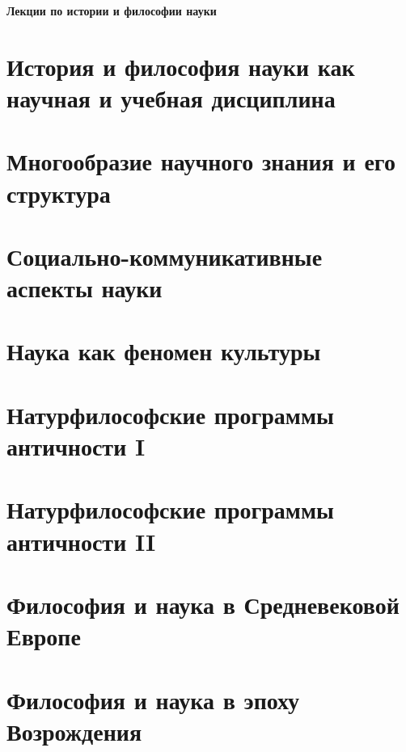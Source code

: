 \documentclass[a4paper, 12pt, notitlepage]{report}
\begin{document}
\begin{titlepage}
    \centering
    \vspace*{9cm}
    {\Huge \textbf{Лекции по истории и философии науки}}
    \vfill
\end{titlepage}

\tableofcontents

\chapter{История и философия науки как научная и учебная дисциплина}


\chapter{Многообразие научного знания и его структура}


\chapter{Социально-коммуникативные аспекты науки}


\chapter{Наука как феномен культуры}


\chapter{Натурфилософские программы античности I}


\chapter{Натурфилософские программы античности II}


\chapter{Философия и наука в Средневековой Европе}


\chapter{Философия и наука в эпоху Возрождения}

\end{document}
